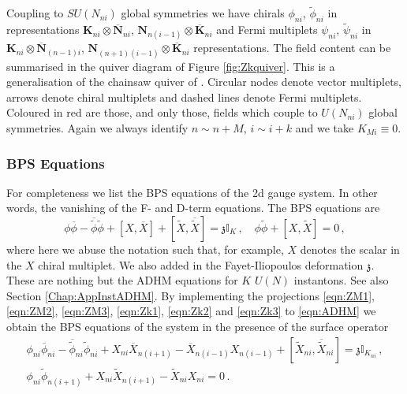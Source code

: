 \documentclass[main.tex]{subfiles}
\begin{document}
Coupling to $SU(N_{ni})$ global symmetries we have chirals $\phi_{ni}$, $\widetilde{\phi}_{ni}$ in representations $\mathbf{K}_{ni}\otimes \overline{\mathbf{N}}_{ni}$, $\mathbf{N}_{n(i-1)}\otimes \overline{\mathbf{K}}_{ni}$ and Fermi multiplets $\psi_{ni}$, $\widetilde{\psi}_{ni}$ in $\mathbf{K}_{ni}\otimes \overline{\mathbf{N}}_{(n-1)i}$, $\mathbf{N}_{(n+1)(i-1)}\otimes \overline{\mathbf{K}}_{ni}$ representations.
The field content can be summarised in the quiver diagram of Figure \ref{fig:Zkquiver}. This is a generalisation of the chainsaw quiver of \cite{Kanno:2011fw}. Circular nodes denote vector multiplets, arrows denote chiral multiplets and dashed lines denote Fermi multiplets. Coloured in red are those, and only those, fields which couple to $U(N_{ni})$ global symmetries. Again we always identify $n\sim n+M$, $i\sim i+k$ and we take $K_{Mi}\equiv0$.

\subsubsection{BPS Equations}
For completeness we list the BPS equations of the 2d gauge system. In other words, the vanishing of the F- and D-term equations. The BPS equations are
\begin{equation}\label{eqn:ADHM}
\phi\overline{\phi}-\overline{\widetilde{\phi}}\widetilde{\phi}+[X,\overline{X}]+[\widetilde{X},\overline{\widetilde{X}}]=\mathfrak{z}\mathbb{I}_K\,,\quad
\phi\widetilde{\phi}+[X,\widetilde{X}]=0\,,
\end{equation}
where here we abuse the notation such that, for example, $X$ denotes the scalar in the $X$ chiral multiplet. We also added in the Fayet-Iliopoulos deformation $\mathfrak{z}$. These are nothing but the ADHM equations for $K$ $U(N)$ instantons. See also Section \ref{Chap:AppInstADHM}. By implementing the projections \eqref{eqn:ZM1}, \eqref{eqn:ZM2}, \eqref{eqn:ZM3}, \eqref{eqn:Zk1}, \eqref{eqn:Zk2} and \eqref{eqn:Zk3} to \eqref{eqn:ADHM} we obtain the BPS equations of the system in the presence of the surface operator
\begin{gather}
\phi_{ni}\overline{\phi}_{ni}-\overline{\widetilde{\phi}}_{ni}\widetilde{\phi}_{ni}+X_{ni}\overline{X}_{n(i+1)}-\overline{X}_{n(i-1)}X_{n(i-1)}+[\widetilde{X}_{ni},\overline{\widetilde{X}}_{ni}]=\mathfrak{z}\mathbb{I}_{K_{ni}}\,,\label{eqn:ADHMZk1}\\
\phi_{ni}\widetilde{\phi}_{n(i+1)}+X_{ni}\widetilde{X}_{n(i+1)}-\widetilde{X}_{ni}X_{ni}=0\,.\label{eqn:ADHMZk2}
\end{gather}
\end{document}

